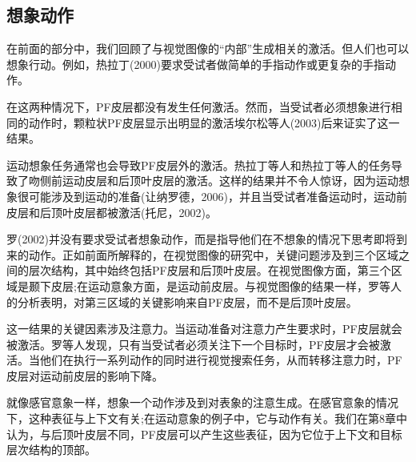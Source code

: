 \subsection{想象动作}
在前面的部分中，我们回顾了与视觉图像的“内部”生成相关的激活。但人们也可以想象行动。例如，热拉丁(2000)要求受试者做简单的手指动作或更复杂的手指动作。
\par
在这两种情况下，PF皮层都没有发生任何激活。然而，当受试者必须想象进行相同的动作时，颗粒状PF皮层显示出明显的激活埃尔松等人(2003)后来证实了这一结果。
\par
运动想象任务通常也会导致PF皮层外的激活。热拉丁等人和热拉丁等人的任务导致了吻侧前运动皮层和后顶叶皮层的激活。这样的结果并不令人惊讶，因为运动想象很可能涉及到运动的准备(让纳罗德，2006)，并且当受试者准备运动时，运动前皮层和后顶叶皮层都被激活(托尼，2002)。
\par
罗(2002)并没有要求受试者想象动作，而是指导他们在不想象的情况下思考即将到来的动作。正如前面所解释的，在视觉图像的研究中，关键问题涉及到三个区域之间的层次结构，其中始终包括PF皮层和后顶叶皮层。在视觉图像方面，第三个区域是颞下皮层;在运动意象方面，是运动前皮层。与视觉图像的结果一样，罗等人的分析表明，对第三区域的关键影响来自PF皮层，而不是后顶叶皮层。
\par
这一结果的关键因素涉及注意力。当运动准备对注意力产生要求时，PF皮层就会被激活。罗等人发现，只有当受试者必须关注下一个目标时，PF皮层才会被激活。当他们在执行一系列动作的同时进行视觉搜索任务，从而转移注意力时，PF皮层对运动前皮层的影响下降。
\par
就像感官意象一样，想象一个动作涉及到对表象的注意生成。在感官意象的情况下，这种表征与上下文有关;在运动意象的例子中，它与动作有关。我们在第8章中认为，与后顶叶皮层不同，PF皮层可以产生这些表征，因为它位于上下文和目标层次结构的顶部。
\par
